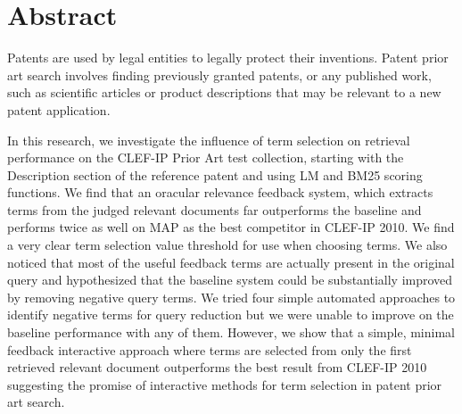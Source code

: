\chapter*{Abstract}
\vspace{-1em}
Patents are used by legal entities to legally protect their inventions. Patent prior art search involves finding previously granted patents, or any published work, such as scientific articles or product descriptions that may be relevant to a new patent application.

In this research, we investigate the influence of term selection on retrieval
performance on the CLEF-IP Prior Art test collection, starting with
the Description section of the reference patent and using LM and BM25
scoring functions. We find that an oracular relevance feedback system,
which extracts terms from the judged relevant documents far
outperforms the baseline and performs twice as well on MAP as the best
competitor in CLEF-IP 2010.  We find a very clear term selection value
threshold for use when choosing terms.  We also noticed that most of
the useful feedback terms are actually present in the original query
and hypothesized that the baseline system could be substantially
improved by removing negative query terms.
We tried four simple automated approaches to identify negative terms
for query reduction but we were unable to improve on the baseline
performance with any of them.  However, we show that a
simple, minimal feedback interactive approach where terms are selected
from only the first retrieved relevant document outperforms the best
result from CLEF-IP 2010 suggesting the promise of interactive methods
for term selection in patent prior art search.

